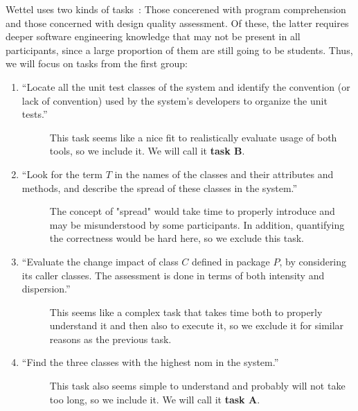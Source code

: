 \documentclass[../thesis]{subfiles}
\begin{document}
Wettel uses two kinds of tasks~\cite[128--130]{wettel2011}:
Those concerened with program comprehension and those concerned with design quality assessment.
Of these, the latter requires deeper software engineering knowledge that may not be present in all participants, since a large proportion of them are still going to be students.
Thus, we will focus on tasks from the first group:
\begin{enumerate}
	\item \enquote{Locate all the unit test classes of the system and identify the convention (or lack of convention) used by the system’s developers to organize the unit tests.}
	      \begin{description}
		      \item[\follows{}] This task seems like a nice fit to realistically evaluate usage of both tools, so we include it.
		            We will call it \textbf{task $\bm{B}$}.
	      \end{description}
	\item \enquote{Look for the term $T$ in the names of the classes and their attributes and methods, and describe the spread of these classes in the system.}
	      \begin{description}
		      \item[\follows{}] The concept of "spread" would take time to properly introduce and may be misunderstood by some participants.
		            In addition, quantifying the correctness would be hard here, so we exclude this task.
	      \end{description}
	\item \enquote{Evaluate the change impact of class $C$ defined in package $P$, by considering its caller classes. The assessment is done in terms of both intensity and dispersion.}
	      \begin{description}
		      \item[\follows{}] This seems like a complex task that takes time both to properly understand it and then also to execute it, so we exclude it for similar reasons as the previous task.
	      \end{description}
	\item \enquote{Find the three classes with the highest \gls{nom} in the system.}
	      \begin{description}
		      \item[\follows{}] This task also seems simple to understand and probably will not take too long, so we include it.
		            We will call it \textbf{task $\bm{A}$}.
	      \end{description}
\end{enumerate}
\end{document}
